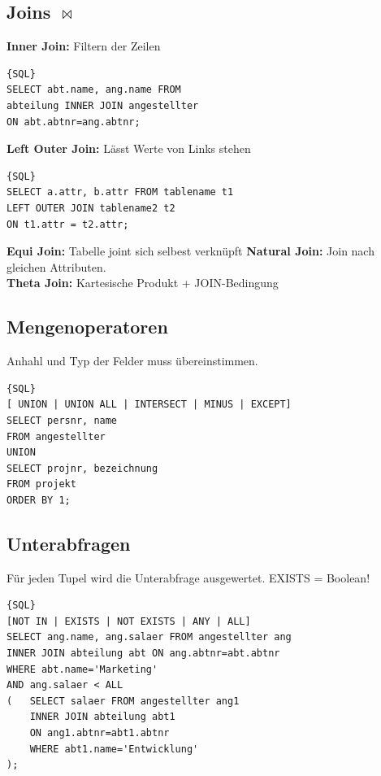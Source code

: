 \documentclass[7pt,landscape,a4paper]{scrartcl}
\begin{document}
\begin{multicols*}{4}
\subsection{Joins $\Join$}
\textbf{Inner Join:} Filtern der Zeilen
\begin{lstlisting}{SQL}
SELECT abt.name, ang.name FROM
abteilung INNER JOIN angestellter
ON abt.abtnr=ang.abtnr;
\end{lstlisting}
\textbf{Left Outer Join:} Lässt Werte von Links stehen
\begin{lstlisting}{SQL}
SELECT a.attr, b.attr FROM tablename t1
LEFT OUTER JOIN tablename2 t2
ON t1.attr = t2.attr;
\end{lstlisting}
\textbf{Equi Join:} Tabelle joint sich selbest verknüpft
\textbf{Natural Join:} Join nach gleichen Attributen.\\
\textbf{Theta Join: } Kartesische Produkt + JOIN-Bedingung
\subsection{Mengenoperatoren}
Anhahl und Typ der Felder muss übereinstimmen. 
\begin{lstlisting}{SQL}
[ UNION | UNION ALL | INTERSECT | MINUS | EXCEPT]
SELECT persnr, name
FROM angestellter 
UNION
SELECT projnr, bezeichnung 
FROM projekt
ORDER BY 1;
\end{lstlisting}
\subsection{Unterabfragen}
Für jeden Tupel wird die Unterabfrage ausgewertet. EXISTS = Boolean!
\begin{lstlisting}{SQL}
[NOT IN | EXISTS | NOT EXISTS | ANY | ALL]
SELECT ang.name, ang.salaer FROM angestellter ang
INNER JOIN abteilung abt ON ang.abtnr=abt.abtnr
WHERE abt.name='Marketing'
AND ang.salaer < ALL
(	SELECT salaer FROM angestellter ang1 
	INNER JOIN abteilung abt1
	ON ang1.abtnr=abt1.abtnr
	WHERE abt1.name='Entwicklung'
);
\end{lstlisting}

\end{multicols*}
\end{document}
